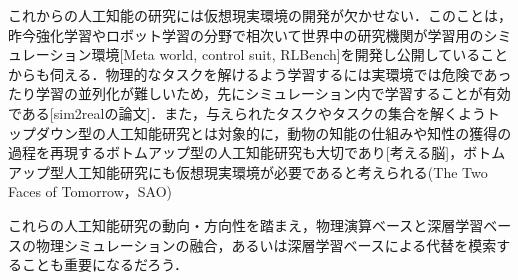 これからの人工知能の研究には仮想現実環境の開発が欠かせない．このことは，昨今強化学習やロボット学習の分野で相次いて世界中の研究機関が学習用のシミュレーション環境[Meta world, control suit, RLBench]を開発し公開していることからも伺える．物理的なタスクを解けるよう学習するには実環境では危険であったり学習の並列化が難しいため，先にシミュレーション内で学習することが有効である[sim2realの論文]．また，与えられたタスクやタスクの集合を解くようトップダウン型の人工知能研究とは対象的に，動物の知能の仕組みや知性の獲得の過程を再現するボトムアップ型の人工知能研究も大切であり[考える脳]，ボトムアップ型人工知能研究にも仮想現実環境が必要であると考えられる(The Two Faces of Tomorrow，SAO)

これらの人工知能研究の動向・方向性を踏まえ，物理演算ベースと深層学習ベースの物理シミュレーションの融合，あるいは深層学習ベースによる代替を模索することも重要になるだろう．